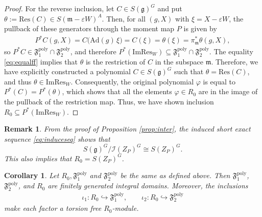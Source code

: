 \documentclass[11pt]{amsart}
\theoremstyle{definition}
\theoremstyle{plain}
\newtheorem{corollary}[theorem]{Corollary}
\newtheorem{remark}[theorem]{Remark}
\theoremstyle{conclusion}
\begin{document}
\begin{proof}
For the reverse inclusion, let $C \in S(\mathfrak{g})^G$ and put $\theta:=\mathrm{Res}(C)\in S(\mathfrak{m} -\varepsilon W)^A$. Then, for all $(g,X)$ with $\xi=X-\varepsilon W$, the pullback of these generators through the moment map $P$ is given by \begin{align}
P^*C(g,X) = C\bigl(\mathrm{Ad}(g)\,\xi\bigr)=C(\xi)=\theta(\xi)=\pi_{\mathfrak{m}}^*\theta(g,X), \label{eq:equalff}
\end{align}  so $P^*C\in \mathfrak{F}_1^{\mathrm{poly}}\cap \mathfrak{F}_2^{\mathrm{poly}}$, and therefore $P^*(\mathrm{Im}\mathrm{Res}_W)\subseteq \mathfrak{F}_1^{\mathrm{poly}}\cap \mathfrak{F}_2^{\mathrm{poly}}$. The equality \eqref{eq:equalff} implies that $\theta$ is the restriction of $C$ in the subspace $\mathfrak{m}$. Therefore, we have explicitly constructed a polynomial $C\in S(\mathfrak{g})^G$ such that $\theta=\mathrm{Res}(C)$, and thus $\theta\in\mathrm{Im}\mathrm{Res}_W$. Consequently, the original polynomial $\varphi$ is equal to $P^*(C) = P^*(\theta)$, which shows that all the elements $\varphi \in R_0$ are in the image of the pullback of the restriction map. Thus, we have shown inclusion $R_0 \subseteq P^*(\mathrm{Im} \mathrm{Res}_W)$.
\end{proof}
\begin{remark}
    From the proof of Proposition \ref{prop:inter}, the induced short exact sequence \eqref{eq:induceseq} shows that $$S(\mathfrak{g})^G/\mathcal{I}(Z_P)^G \cong S(Z_P)^G.$$ This also implies that $R_0 = S(Z_P)^G$.
\end{remark}
 \begin{corollary}\label{lem:domainstorsionfree}
Let $R_0,\mathfrak{F}_1^{\mathrm{poly}} $ and $\mathfrak{F}_2^{\mathrm{poly}}$ be the same as defined above.  Then $\mathfrak{F}_1^{\mathrm{poly}}$, $\mathfrak{F}_2^{\mathrm{poly}}$, and $R_0$ are finitely generated integral domains. Moreover, the inclusions \begin{align*}
\iota_1: R_0\hookrightarrow \mathfrak{F}_1^{\mathrm{poly}},\qquad \iota_2: R_0\hookrightarrow \mathfrak{F}_2^{\mathrm{poly}}
\end{align*} make each factor a torsion free $R_0$-module.
\end{corollary}
\end{document}

